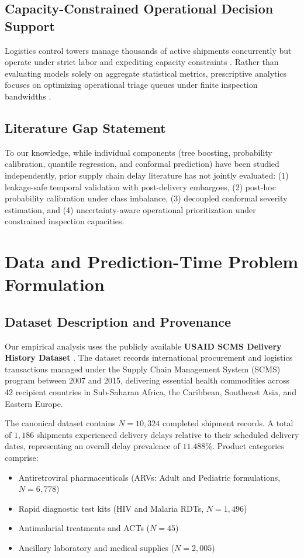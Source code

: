 \documentclass[11pt,a4paper]{article}
\begin{document}
\subsection{Capacity-Constrained Operational Decision Support}
Logistics control towers manage thousands of active shipments concurrently but operate under strict labor and expediting capacity constraints \cite{bastani2021efficient, bertsimas2020predictive}. Rather than evaluating models solely on aggregate statistical metrics, prescriptive analytics focuses on optimizing operational triage queues under finite inspection bandwidths \cite{bastani2021efficient, simchilevi2014superstorms}.

\subsection{Literature Gap Statement}
To our knowledge, while individual components (tree boosting, probability calibration, quantile regression, and conformal prediction) have been studied independently, prior supply chain delay literature has not jointly evaluated: (1) leakage-safe temporal validation with post-delivery embargoes, (2) post-hoc probability calibration under class imbalance, (3) decoupled conformal severity estimation, and (4) uncertainty-aware operational prioritization under constrained inspection capacities.

\section{Data and Prediction-Time Problem Formulation}
\subsection{Dataset Description and Provenance}
Our empirical analysis uses the publicly available \textbf{USAID SCMS Delivery History Dataset} \cite{usaid2015scms, scmsdataset2016}. The dataset records international procurement and logistics transactions managed under the Supply Chain Management System (SCMS) program between 2007 and 2015, delivering essential health commodities across 42 recipient countries in Sub-Saharan Africa, the Caribbean, Southeast Asia, and Eastern Europe.

The canonical dataset contains $N = 10,324$ completed shipment records. A total of $1,186$ shipments experienced delivery delays relative to their scheduled delivery dates, representing an overall delay prevalence of $11.488\%$. Product categories comprise:
\begin{itemize}
    \item Antiretroviral pharmaceuticals (ARVs: Adult and Pediatric formulations, $N = 6,778$)
    \item Rapid diagnostic test kits (HIV and Malaria RDTs, $N = 1,496$)
    \item Antimalarial treatments and ACTs ($N = 45$)
    \item Ancillary laboratory and medical supplies ($N = 2,005$)
\end{itemize}
\end{document}
